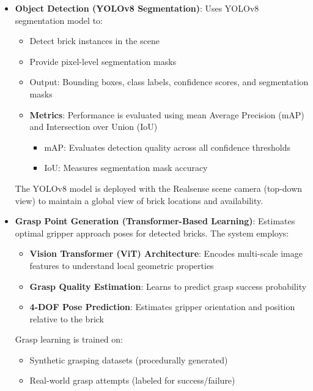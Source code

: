 \begin{itemize}
    \item \textbf{Object Detection (YOLOv8 Segmentation)}: Uses YOLOv8 segmentation model to:
    \begin{itemize}
        \item Detect brick instances in the scene
        \item Provide pixel-level segmentation masks
        \item Output: Bounding boxes, class labels, confidence scores, and segmentation masks
        
        \item \textbf{Metrics}: Performance is evaluated using mean Average Precision (mAP) and Intersection over Union (IoU)
        \begin{itemize}
            \item mAP: Evaluates detection quality across all confidence thresholds
            \item IoU: Measures segmentation mask accuracy
        \end{itemize}
    \end{itemize}
    
    The YOLOv8 model is deployed with the Realsense scene camera (top-down view) to maintain a global view of brick locations and availability.
    
    \item \textbf{Grasp Point Generation (Transformer-Based Learning)}: Estimates optimal gripper approach poses for detected bricks. The system employs:
    \begin{itemize}
        \item \textbf{Vision Transformer (ViT) Architecture}: Encodes multi-scale image features to understand local geometric properties
        \item \textbf{Grasp Quality Estimation}: Learns to predict grasp success probability
        \item \textbf{4-DOF Pose Prediction}: Estimates gripper orientation and position relative to the brick
    \end{itemize}
    
    Grasp learning is trained on:
    \begin{itemize}
        \item Synthetic grasping datasets (procedurally generated)
        \item Real-world grasp attempts (labeled for success/failure)
    \end{itemize}
    

\end{itemize}
